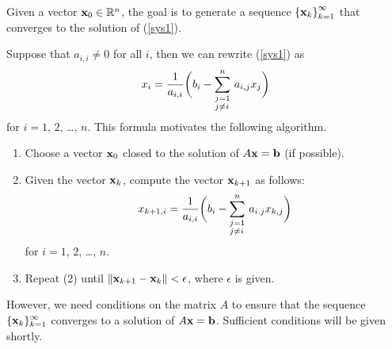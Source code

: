Given a vector $\mathbf{x}_{0} \in \mathbb{R}^n$, the goal is to generate a
sequence $\left\{\mathbf{x}_{k}\right\}_{k=1}^\infty$ that converges to
the solution of (\ref{sys1}).

Suppose that $a_{i,i} \neq 0$ for all $i$, then we can rewrite
(\ref{sys1}) as
\[
x_i = \frac{1}{a_{i,i}}\bigg(b_i -
\sum_{\begin{subarray}{l}j=1\\ j \neq i\end{subarray}}^n \,a_{i,j}x_j \bigg)
\]
for $i=1$, $2$, \ldots, $n$.  This formula motivates the following
algorithm.

\begin{algo}
\begin{enumerate}
\item Choose a vector $\mathbf{x}_{0}$ closed to the solution of
$ A \mathbf{x} = \mathbf{b}$ (if possible).
\item Given the vector $\mathbf{x}_{k}$, compute the vector
$\mathbf{x}_{k+1}$ as follows:
\begin{equation} \label{formula5}
x_{k+1,i} = \frac{1}{a_{i,i}} \bigg( b_i
-\sum_{\begin{subarray}{l}j=1\\ j \neq i\end{subarray}}^n\, a_{i.j}
x_{k,j} \bigg)
\end{equation}
for $i = 1$, $2$, \ldots, $n$.
\item Repeat (2) until $\| \mathbf{x}_{k+1} - \mathbf{x}_{k} \| < \epsilon$,
where $\epsilon$ is given.
\end{enumerate}
\end{algo}

However, we need conditions on the matrix $A$ to ensure that the
sequence $\displaystyle \{\mathbf{x}_k\}_{k=1}^\infty$ converges to a
solution of $A\mathbf{x} = \mathbf{b}$.  Sufficient conditions will be given
shortly.

